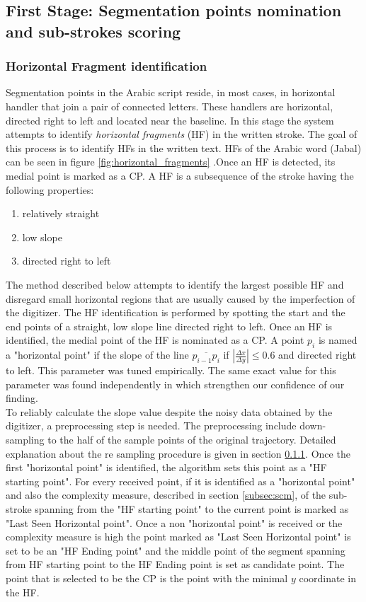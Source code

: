 \documentclass[journal,compsoc]{IEEEtran}
\begin{document}

\subsection{First Stage: Segmentation points nomination and sub-strokes scoring}

\subsubsection{Horizontal Fragment identification}
Segmentation points in the Arabic script reside, in most cases, in horizontal handler that join a pair of connected letters. These handlers are horizontal, directed right to left and located near the baseline. In this stage the system attempts to identify \emph{horizontal fragments} (HF) in the written stroke.
The goal of this process is to identify HFs in the written text. HFs of the Arabic word  (Jabal) can be seen in figure \ref{fig:horizontal_fragments} .Once an HF is detected, its medial point is marked as a CP. A HF is a subsequence of the stroke having the following properties: 
\begin{enumerate}
\item relatively straight
\item low slope
\item directed right to left 
\end{enumerate}
The method described below attempts to identify the largest possible HF and disregard small horizontal regions that are usually caused by the imperfection of the digitizer. The HF identification is performed by spotting the start and the end points of a straight, low slope line directed right to left. Once an HF is identified, the medial point of the HF is nominated as a CP.
A point $p_{i}$ is named a "horizontal point" if the slope of the line $\overline{p_{i-1}p_{i}}$ if $\left|\frac{\Delta x}{\Delta y}\right|\leq0.6$ and directed right to left. This parameter was tuned empirically.
The same exact value for this parameter was found independently in \cite{daifallah2009recognition} which strengthen our confidence of our finding.\\
To reliably calculate the slope value despite the noisy data obtained by the digitizer, a preprocessing step is needed. The preprocessing include down-sampling to the half of the sample points of the original trajectory. Detailed explanation about the re sampling procedure is given in section \ref{}.
Once the first "horizontal point" is identified, the algorithm sets this point as a "HF starting point". For every received point, if it is identified as a "horizontal point" and also the complexity measure, described in section \ref{subsec:scm}, of the sub-stroke spanning from the "HF starting point" to the current point is marked as "Last Seen Horizontal point". Once a non "horizontal point" is received or the complexity measure is high the point marked as "Last Seen Horizontal point" is set to be an "HF Ending point" and the middle point of the segment spanning from HF starting point to the HF Ending point is set as candidate point. The point that is selected to be the CP is the point with the minimal $y$ coordinate in the HF.
\end{document}
